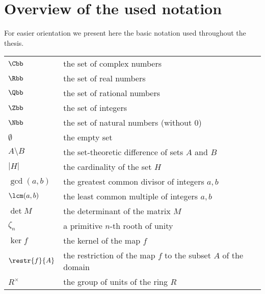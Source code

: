 \chapter*{Overview of the used notation}
For easier orientation we present here the basic notation used throughout the thesis.
\begin{longtable}[l]{ll} %
  $\Cbb$                 & the set of complex numbers \\[1mm]
  $\Rbb$                 & the set of real numbers \\[1mm]
  $\Qbb$                 & the set of rational numbers \\[1mm]
  $\Zbb$                 & the set of integers \\[1mm]
  $\Nbb$                 & the set of natural numbers (without $0$)\\[1mm]
  $\emptyset$                 & the empty set\\[1mm]
  $A\setminus B$  & the set-theoretic difference of sets $A$ and $B$\\[1mm]
  $|H|$						& the cardinality of the set $H$  \\[1mm]
  $\gcd(a,b)$			& the greatest common divisor of integers $a,b$ \\[1mm]
  $\lcm(a,b)$			& the least common multiple of integers $a,b$ \\[1mm]
  $\det M$			& the determinant of the matrix $M$ \\[1mm]
  $\zeta_n$                 & a primitive $n$-th rooth of unity \\[1mm] %
  $\ker f$                 & the kernel of the map $f$ \\[1mm]
  $\restr{f}{A}$		& the restriction of the map $f$ to the subset $A$ of the domain \\[1mm]
  $R^{\times}$		& the group of units of the ring $R$ \\[1mm]

\end{longtable}

